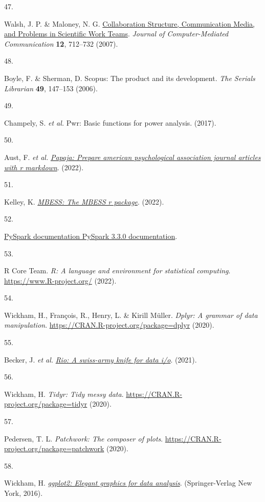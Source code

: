 \documentclass[
  man,floatsintext]{apa6}
\newlength{\cslhangindent}
\newlength{\csllabelwidth}
\newlength{\cslentryspacingunit} %
\newenvironment{CSLReferences}[2] %
 {%
  \setlength{\parindent}{0pt}
  \ifodd #1
  \let\oldpar\par
  \def\par{\hangindent=\cslhangindent\oldpar}
  \fi
  \setlength{\parskip}{#2\cslentryspacingunit}
 }%
 {}
\newcommand{\CSLLeftMargin}[1]{\parbox[t]{\csllabelwidth}{#1}}
\newcommand{\CSLRightInline}[1]{\parbox[t]{\linewidth - \csllabelwidth}{#1}\break}
\begin{document}
\begin{CSLReferences}{0}{0}
\leavevmode{}%
\CSLLeftMargin{47. }%
\CSLRightInline{Walsh, J. P. \& Maloney, N. G. \href{https://doi.org/10.1111/j.1083-6101.2007.00346.x}{Collaboration Structure, Communication Media, and Problems in Scientific Work Teams}. \emph{Journal of Computer-Mediated Communication} \textbf{12}, 712--732 (2007).}

\leavevmode{}%
\CSLLeftMargin{48. }%
\CSLRightInline{Boyle, F. \& Sherman, D. Scopus{\texttrademark}: The product and its development. \emph{The Serials Librarian} \textbf{49}, 147--153 (2006).}

\leavevmode{}%
\CSLLeftMargin{49. }%
\CSLRightInline{Champely, S. \emph{et al.} Pwr: Basic functions for power analysis. (2017).}

\leavevmode{}%
\CSLLeftMargin{50. }%
\CSLRightInline{Aust, F. \emph{et al.} \emph{\href{https://CRAN.R-project.org/package=papaja}{Papaja: Prepare american psychological association journal articles with r markdown}}. (2022).}

\leavevmode{}%
\CSLLeftMargin{51. }%
\CSLRightInline{Kelley, K. \emph{\href{https://CRAN.R-project.org/package=MBESS}{MBESS: The MBESS r package}}. (2022).}

\leavevmode{}%
\CSLLeftMargin{52. }%
\CSLRightInline{\href{https://spark.apache.org/docs/latest/api/python/}{PySpark documentation {\textemdash} PySpark 3.3.0 documentation}.}

\leavevmode{}%
\CSLLeftMargin{53. }%
\CSLRightInline{R Core Team. \emph{R: A language and environment for statistical computing}. \url{https://www.R-project.org/} (2022).}

\leavevmode{}%
\CSLLeftMargin{54. }%
\CSLRightInline{Wickham, H., François, R., Henry, L. \& Kirill Müller. \emph{Dplyr: A grammar of data manipulation}. \url{https://CRAN.R-project.org/package=dplyr} (2020).}

\leavevmode{}%
\CSLLeftMargin{55. }%
\CSLRightInline{Becker, J. \emph{et al.} \emph{\href{https://cran.r-project.org/web/packages/rio/}{Rio: A swiss-army knife for data i/o}}. (2021).}

\leavevmode{}%
\CSLLeftMargin{56. }%
\CSLRightInline{Wickham, H. \emph{Tidyr: Tidy messy data}. \url{https://CRAN.R-project.org/package=tidyr} (2020).}

\leavevmode{}%
\CSLLeftMargin{57. }%
\CSLRightInline{Pedersen, T. L. \emph{Patchwork: The composer of plots}. \url{https://CRAN.R-project.org/package=patchwork} (2020).}

\leavevmode{}%
\CSLLeftMargin{58. }%
\CSLRightInline{Wickham, H. \emph{\href{https://ggplot2.tidyverse.org}{ggplot2: Elegant graphics for data analysis}}. (Springer-Verlag New York, 2016).}

\end{CSLReferences}
\end{document}
